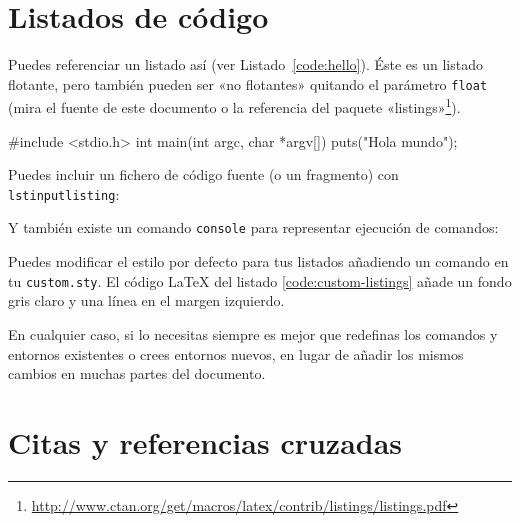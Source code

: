 \section{Listados de código}
\label{sec:listado}

Puedes referenciar un listado así (ver Listado~\ref{code:hello}). Éste es un listado flotante, pero también pueden ser «no flotantes» quitando el parámetro \texttt{float} (mira el fuente de este documento o la referencia del paquete «listings»\footnote{\url{http://www.ctan.org/get/macros/latex/contrib/listings/listings.pdf}}).

\begin{listing}[
  float=ht,
  language = C,
  caption  = {«Hola mundo» en C},
  label    = code:hello]
#include <stdio.h>
int main(int argc, char *argv[]) {
    puts("Hola mundo\n");
}
\end{listing}

\noindent
Puedes incluir un fichero de código fuente (o un fragmento) con \texttt{lstinputlisting}:



\noindent
Y también existe un comando \texttt{console} para representar ejecución de comandos:


Puedes modificar el estilo por defecto para tus listados añadiendo un comando  en tu \texttt{custom.sty}. El código \LaTeX{} del listado \ref{code:custom-listings} añade un fondo gris claro y una línea en el margen izquierdo.

\begin{listing}[
  float=h!,
  caption  = {Personalizando los listados de código},
  label    = code:custom-listings]
\end{listing}

En cualquier caso, si lo necesitas siempre es mejor que redefinas los comandos y entornos existentes o crees entornos nuevos, en lugar de añadir los mismos cambios en muchas partes del documento.


\section{Citas y referencias cruzadas}

